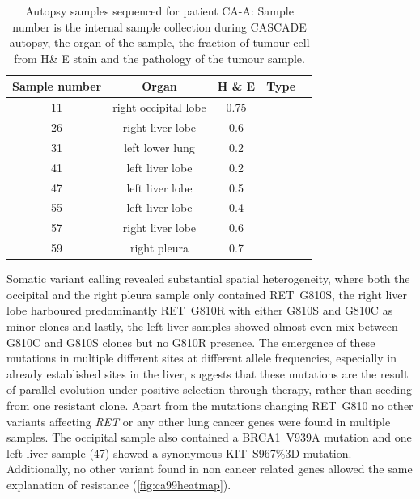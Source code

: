 \begin{table}[ht]
\caption[Autopsy samples sequenced for patient CA-A]{Autopsy samples sequenced for patient CA-A: Sample number is the internal sample collection during CASCADE autopsy, the organ of the sample, the fraction of tumour cell from H\& E stain and the pathology of the tumour sample.}\label{tab:ca99wgsSamples}
\centering
{}
\begin{tabular}{|c|c|c|c|c|}
\toprule
\hline
 \rowcolor{gray!50}
\textbf{Sample number} & \textbf{Organ} & \textbf{H \& E} & \textbf{Type}\\
\hline
 11 & right occipital lobe & 0.75 &  \cellcolor{white}\\
 26 & right liver lobe & 0.6 & \cellcolor{white} \\
 31 & left lower lung & 0.2 & \cellcolor{white} \\
 41 & left liver lobe & 0.2 & \cellcolor{white} \\
 47 & left liver lobe & 0.5 & \cellcolor{white} \\
 55 & left liver lobe & 0.4 & \cellcolor{white} \\
 57 & right liver lobe & 0.6 & \cellcolor{white} \\
 59 & right pleura & 0.7 & \cellcolor{white}\multirow{-8}{*}{lung adenocarcinoma} \\
 \hline
\bottomrule
\end{tabular}
\end{table} 

Somatic variant calling revealed substantial spatial heterogeneity, where both the occipital and the right pleura sample only contained RET~G810S, the right liver lobe harboured predominantly RET~G810R with either G810S and G810C as minor clones and lastly, the left liver samples showed almost even mix between G810C and G810S clones but no G810R presence. The emergence of these mutations in multiple different sites at different allele frequencies, especially in already established sites in the liver, suggests that these mutations are the result of parallel evolution under positive selection through therapy, rather than seeding from one resistant clone.
Apart from the mutations changing RET~G810 no other variants affecting \textit{RET} or any other lung cancer genes were found in multiple samples. The occipital sample also contained a BRCA1~V939A  mutation and one left liver sample (47) showed a synonymous KIT~S967\%3D mutation. Additionally, no other variant found in non cancer related genes allowed the same explanation of resistance (\autoref{fig:ca99heatmap}).

